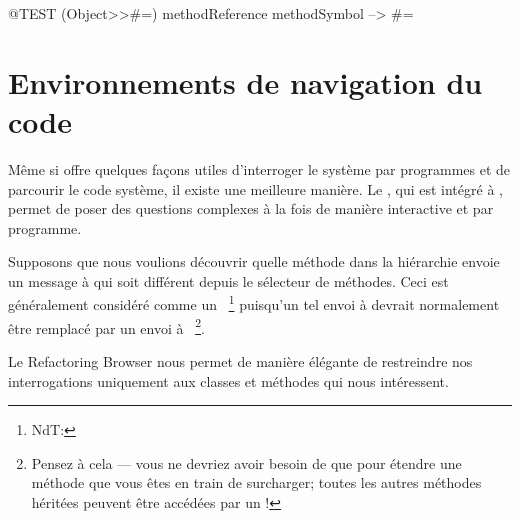 \documentclass[a4paper,10pt,twoside]{book}
\begin{document}
\begin{code}{@TEST}
(Object>>#=) methodReference methodSymbol --> #=
\end{code}

\section{Environnements de navigation du code}

Même si  offre quelques façons utiles d'interroger le système par programmes et de parcourir le code système, il existe une meilleure manière. Le , qui est intégré à \pharo, permet de poser des questions complexes à la fois de manière interactive et par programme.

Supposons que nous voulions découvrir quelle méthode dans la hiérarchie  envoie un message à \super qui soit différent depuis le sélecteur de méthodes. Ceci est généralement considéré comme un ~\footnote{NdT: } puisqu'un tel envoi à \super devrait normalement être remplacé par un envoi à \self ~\footnote{Pensez à cela --- vous ne devriez avoir besoin de \super que pour étendre une méthode que vous êtes en train de surcharger; toutes les autres méthodes héritées peuvent être accédées par un \self!}. %

Le Refactoring Browser nous permet de manière élégante de restreindre nos interrogations uniquement aux classes et méthodes qui nous intéressent. 

\end{document}

